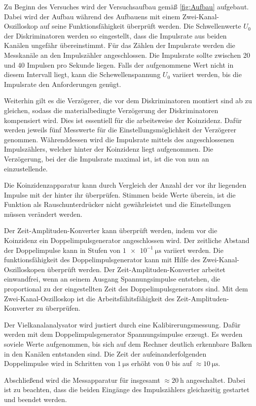 Zu Beginn des Versuches wird der Versuchsaufbau gemäß \ref{fig:Aufbau} aufgebaut.
Dabei wird der Aufbau während des Aufbauens mit einem Zwei-Kanal-Oszilloskop
auf seine Funktionsfähigkeit überprüft werden.
Die Schwellenwerte $U_0$ der Diskriminatoren werden so eingestellt, dass
die Impulsrate aus beiden Kanälen ungefähr übereinstimmt. Für das Zählen der
Impulsrate werden die Messkanäle an den Impulszähler angeschlossen.
Die Impulsrate sollte zwischen 20 und 40 Impulsen pro Sekunde liegen.
Falls der aufgenommene Wert nicht in diesem Intervall liegt, kann die
Schewellenspannung $U_0$ variiert werden, bis die Impulsrate den Anforderungen genügt.

Weiterhin gilt es die Verzögerer, die vor dem Diskriminatoren montiert sind
ab zu gleichen, sodass die materialbedingte Verzögerung der Diskriminatoren
kompensiert wird. Dies ist essentiell für die arbeitsweise der Koinzidenz.
Dafür werden jeweils fünf Messwerte für die Einstellungsmöglichkeit der Verzögerer genommen.
Währenddessen wird die Impulsrate mittels des angeschlossenen Impulszählers, welcher hinter
der Koinzidenz liegt aufgenommen.
Die Verzögerung, bei der die Impulsrate maximal ist, ist die von nun an einzustellende.

Die Koinzidenzapparatur kann durch Vergleich der Anzahl der vor ihr liegenden
Impulse mit der hinter ihr überprüfen. Stimmen beide Werte überein, ist
die Funktion als Rauschunterdrücker nicht gewährleistet und die Einstellungen müssen
verändert werden.

Der Zeit-Amplituden-Konverter kann überprüft werden, indem vor die Koinzidenz ein
Doppelimpulsgenerator angeschlossen wird. Der zeitliche Abstand der
Doppelimpulse kann in Stufen von $\SI{1e-1}{\micro\second}$ variiert werden.
Die funktionsfähigkeit des Doppelimpulsgenerator kann mit Hilfe des
Zwei-Kanal-Oszilloskopen überprüft werden.
Der Zeit-Amplituden-Konverter arbeitet einwandfrei, wenn an seinem
Ausgang Spannungsimpulse entstehen, die proportional zu der
eingestellten Zeit des Doppelimpulsgenerators sind. Mit dem Zwei-Kanal-Oszilloskop
ist die Arbeitsfähitsfähigkeit des Zeit-Amplituden-Konverter zu überprüfen.

Der Vielkanalanalysator wird justiert durch eine Kalibirerungsmessung.
Dafür werden mit dem Doppelimpulsgenerator Spannungsimpulse erzeugt.
Es werden soviele Werte aufgenommen, bis sich auf dem Rechner deutlich
erkennbare Balken in den Kanälen entstanden sind.
Die Zeit der aufeinanderfolgenden Doppelimpulse wird in Schritten von $\SI{1}{\micro\second}$
erhöht von 0 bis auf $\approx \SI{10}{\micro\second}$.

Abschließend wird die Messapparatur für insgesamt $\approx \SI{20}{\hour}$
angeschaltet. Dabei ist zu beachten, dass die beiden Eingänge des Impulszählers
gleichzeitig gestartet und beendet werden.
